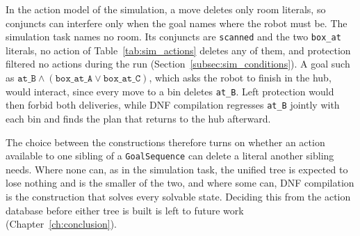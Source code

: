     In the action model of the simulation, a move deletes only room literals, so conjuncts can interfere only when the goal names where the robot must be.
    The simulation task names no room.
    Its conjuncts are \texttt{scanned} and the two \texttt{box\_at} literals, no action of Table~\ref{tab:sim_actions} deletes any of them, and protection filtered no actions during the run (Section~\ref{subsec:sim_conditions}).
    A goal such as $\texttt{at\_B} \wedge (\texttt{box\_at\_A} \vee \texttt{box\_at\_C})$, which asks the robot to finish in the hub, would interact, since every move to a bin deletes \texttt{at\_B}.
    Left protection would then forbid both deliveries, while DNF compilation regresses \texttt{at\_B} jointly with each bin and finds the plan that returns to the hub afterward.

    The choice between the constructions therefore turns on whether an action available to one sibling of a \texttt{GoalSequence} can delete a literal another sibling needs.
    Where none can, as in the simulation task, the unified tree is expected to lose nothing and is the smaller of the two, and where some can, DNF compilation is the construction that solves every solvable state.
    Deciding this from the action database before either tree is built is left to future work (Chapter~\ref{ch:conclusion}).